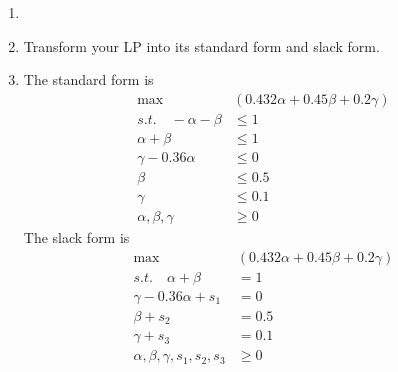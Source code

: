\documentclass[12pt,a4paper]{article}
\makeatletter
\newtheorem*{solution}{Solution}
\theoremstyle{definition}
\renewenvironment{solution}[1][Solution] {\par\pushQED{\qed}\normalfont\topsep6\p@\@plus6\p@\relax\trivlist\item[\hskip\labelsep\bfseries#1\@addpunct{.}]\ignorespaces}{\popQED\endtrivlist\@endpefalse} \makeatother
\makeatother
\begin{document}
\begin{enumerate}
\begin{enumerate}
\begin{solution}
    \end{solution}
    \item
    Transform your LP into its standard form and slack form.
    \begin{solution}
      The standard form is 
      \begin{align*}
        \max &(0.432\alpha+0.45\beta+0.2\gamma)\\
        s.t.\quad-\alpha - \beta &\leq 1\\
        \alpha + \beta &\leq 1\\
        \gamma -0.36\alpha &\leq 0\\
        \beta &\leq 0.5\\
        \gamma  &\leq 0.1\\
        \alpha,\beta,\gamma&\geq 0
      \end{align*}
      The slack form is
      \begin{align*}
        \max &(0.432\alpha+0.45\beta+0.2\gamma)\\
        s.t.\quad\alpha +\beta &= 1\\
        \gamma -0.36\alpha +s_1&= 0\\
        \beta +s_2&= 0.5\\
        \gamma +s_3 &= 0.1\\
        \alpha,\beta,\gamma,s_1,s_2,s_3&\geq 0
      \end{align*}
    \end{solution}

\end{enumerate}
\end{enumerate}
\end{document}
